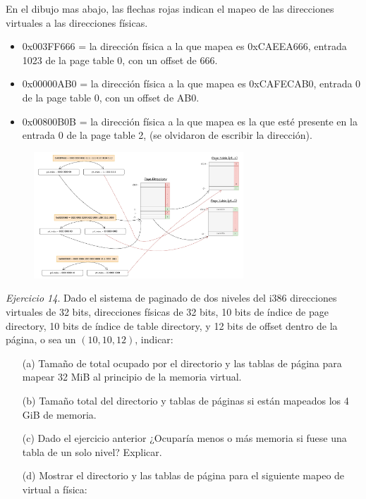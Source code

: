 \documentclass[12pt]{article}
\begin{document}
\begin{rta}
    En el dibujo mas abajo, las flechas rojas indican el mapeo de las direcciones virtuales a las direcciones físicas.
    \begin{itemize}
        \item 0x003FF666 = la dirección física a la que mapea es 0xCAEEA666, entrada 1023 de la page table 0, con un offset de 666.
        \item 0x00000AB0 = la dirección física a la que mapea es 0xCAFECAB0, entrada 0 de la page table 0, con un offset de AB0.
        \item 0x00800B0B = la dirección física a la que mapea es la que esté presente en la entrada 0 de la page table 2, (se olvidaron de escribir la dirección).
    \end{itemize}
\end{rta}

\begin{figure}[h]
    \centering
    \includegraphics[width=0.7\textwidth]{ej132.pdf}
\end{figure}


\newpage
\noindent \textit{Ejercicio 14}. Dado el sistema de paginado de dos niveles del i386 direcciones virtuales de 32 bits, direcciones físicas de 32 bits, 10 bits de índice de page directory, 10 bits de índice de table directory, y 12 bits de offset dentro de la página, o sea un $(10,10,12)$, indicar:
\begin{itemize}
    \item[(a)] Tamaño de total ocupado por el directorio y las tablas de página para mapear 32 MiB al principio de la memoria virtual.
    \item[(b)] Tamaño total del directorio y tablas de páginas si están mapeados los 4 GiB de memoria.
    \item[(c)] Dado el ejercicio anterior ¿Ocuparía menos o más memoria si fuese una tabla de un solo nivel? Explicar.
    \item[(d)] Mostrar el directorio y las tablas de página para el siguiente mapeo de virtual a física:
\end{itemize}
\end{document}
